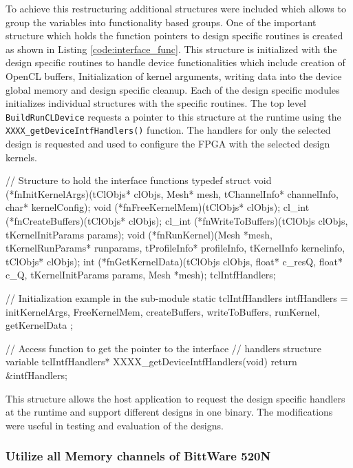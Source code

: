 To achieve this restructuring additional structures were included which allows to
group the variables into functionality based groups. One of the important structure
which holds the function pointers to design specific routines is created
as shown in Listing \ref{code:interface_func}. This structure is initialized
with the design specific routines to handle device functionalities which
include creation of OpenCL buffers, Initialization of kernel arguments,
writing data into the device global memory and design specific cleanup.
Each of the design specific modules initializes individual structures
with the specific routines. The top level \texttt{BuildRunCLDevice} requests
a pointer to this structure at the runtime using the \texttt{XXXX\_getDeviceIntfHandlers()}
function. The handlers for only the selected design is requested and used to configure the
FPGA with the selected design kernels.
\begin{CppCode}[caption=Structure to hold the design specific interface function pointers
    and initialization example, frame=tlrb, label=code:interface_func, float]
// Structure to hold the interface functions
typedef struct
{
    void (*fnInitKernelArgs)(tClObjs* clObjs, Mesh* mesh, tChannelInfo* channelInfo,
                             char* kernelConfig);
    void (*fnFreeKernelMem)(tClObjs* clObjs);
    cl_int (*fnCreateBuffers)(tClObjs* clObjs);
    cl_int (*fnWriteToBuffers)(tClObjs clObjs, tKernelInitParams params);
    void (*fnRunKernel)(Mesh *mesh, tKernelRunParams* runparams, tProfileInfo* profileInfo,
                        tKernelInfo kernelinfo, tClObjs* clObjs);
    int (*fnGetKernelData)(tClObjs clObjs, float* c_resQ, float* c_Q,
                           tKernelInitParams params, Mesh *mesh);
} tclIntfHandlers;

// Initialization example in the sub-module
static tclIntfHandlers intfHandlers =
{
    initKernelArgs,
    FreeKernelMem,
    createBuffers,
    writeToBuffers,
    runKernel,
    getKernelData
};

// Access function to get the pointer to the interface
// handlers structure variable
tclIntfHandlers* XXXX_getDeviceIntfHandlers(void)
{
    return &intfHandlers;
}
\end{CppCode}

This structure allows the host application to request the design specific handlers at the
runtime and support different designs in one binary. The modifications were useful in testing
and evaluation of the designs.

\subsubsection*{Utilize all Memory channels of BittWare 520N}


